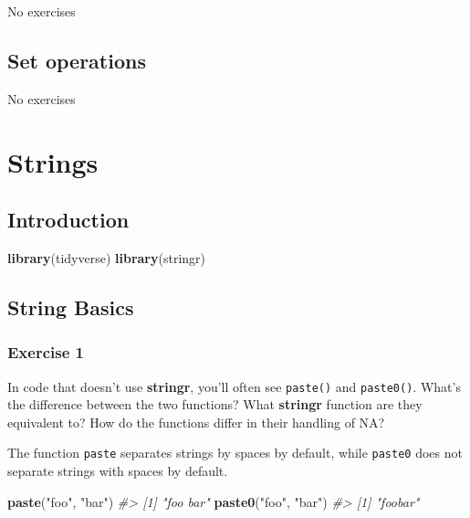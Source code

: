 \documentclass[]{book}
\newenvironment{Shaded}{\begin{snugshade}}{\end{snugshade}}
\newcommand{\CommentTok}[1]{\textcolor[rgb]{0.56,0.35,0.01}{\textit{#1}}}
\newcommand{\KeywordTok}[1]{\textcolor[rgb]{0.13,0.29,0.53}{\textbf{#1}}}
\newcommand{\NormalTok}[1]{#1}
\newcommand{\StringTok}[1]{\textcolor[rgb]{0.31,0.60,0.02}{#1}}
\theoremstyle{definition}
\theoremstyle{definition}
\theoremstyle{definition}
\theoremstyle{remark}
\begin{document}
No exercises

\hypertarget{set-operations}{%
\section{Set operations}\label{set-operations}}

No exercises

\hypertarget{strings}{%
\chapter{Strings}\label{strings}}

\hypertarget{introduction-8}{%
\section{Introduction}\label{introduction-8}}

\begin{Shaded}
\begin{Highlighting}[]
\KeywordTok{library}\NormalTok{(tidyverse)}
\KeywordTok{library}\NormalTok{(stringr)}
\end{Highlighting}
\end{Shaded}

\hypertarget{string-basics}{%
\section{String Basics}\label{string-basics}}

\hypertarget{exercise-1-25}{%
\subsection{Exercise 1}\label{exercise-1-25}}

In code that doesn't use \textbf{stringr}, you'll often see
\texttt{paste()} and \texttt{paste0()}. What's the difference between
the two functions? What \textbf{stringr} function are they equivalent
to? How do the functions differ in their handling of NA?

The function \texttt{paste} separates strings by spaces by default,
while \texttt{paste0} does not separate strings with spaces by default.

\begin{Shaded}
\begin{Highlighting}[]
\KeywordTok{paste}\NormalTok{(}\StringTok{"foo"}\NormalTok{, }\StringTok{"bar"}\NormalTok{)}
\CommentTok{#> [1] "foo bar"}
\KeywordTok{paste0}\NormalTok{(}\StringTok{"foo"}\NormalTok{, }\StringTok{"bar"}\NormalTok{)}
\CommentTok{#> [1] "foobar"}
\end{Highlighting}
\end{Shaded}
\end{document}
